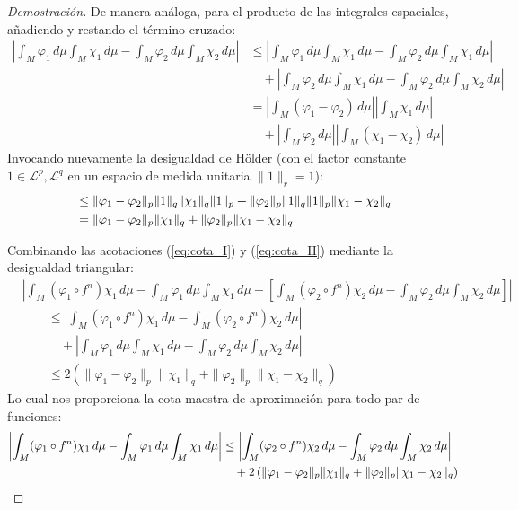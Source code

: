 \begin{proof}[Demostración]
	De manera análoga, para el producto de las integrales espaciales, añadiendo y restando el término cruzado:
	\begin{align*}
		\left| \int_M \varphi_1 \, d\mu \int_M \chi_1 \, d\mu - \int_M \varphi_2 \, d\mu \int_M \chi_2 \, d\mu \right| &\le \left| \int_M \varphi_1 \, d\mu \int_M \chi_1 \, d\mu - \int_M \varphi_2 \, d\mu \int_M \chi_1 \, d\mu \right| \\
		&\quad + \left| \int_M \varphi_2 \, d\mu \int_M \chi_1 \, d\mu - \int_M \varphi_2 \, d\mu \int_M \chi_2 \, d\mu \right| \\
		&= \left| \int_M (\varphi_1 - \varphi_2) \, d\mu \right| \left| \int_M \chi_1 \, d\mu \right| \\
		&\quad + \left| \int_M \varphi_2 \, d\mu \right| \left| \int_M (\chi_1 - \chi_2) \, d\mu \right|
	\end{align*}
	Invocando nuevamente la desigualdad de Hölder (con el factor constante $1 \in \mathcal{L}^p, \mathcal{L}^q$ en un espacio de medida unitaria $\|1\|_r = 1$):
	\begin{align}
		&\le \|\varphi_1 - \varphi_2\|_p \|1\|_q \|\chi_1\|_q \|1\|_p + \|\varphi_2\|_p \|1\|_q \|1\|_p \|\chi_1 - \chi_2\|_q \notag \\
		&= \|\varphi_1 - \varphi_2\|_p \|\chi_1\|_q + \|\varphi_2\|_p \|\chi_1 - \chi_2\|_q \label{eq:cota_II}
	\end{align}
	
	Combinando las acotaciones (\ref{eq:cota_I}) y (\ref{eq:cota_II}) mediante la desigualdad triangular:
	\begin{align*}
		&\left| \int_M (\varphi_1 \circ f^n)\chi_1 \, d\mu - \int_M \varphi_1 \, d\mu \int_M \chi_1 \, d\mu - \left[ \int_M (\varphi_2 \circ f^n)\chi_2 \, d\mu - \int_M \varphi_2 \, d\mu \int_M \chi_2 \, d\mu \right] \right| \\
		&\qquad \le \left| \int_M (\varphi_1 \circ f^n)\chi_1 \, d\mu - \int_M (\varphi_2 \circ f^n)\chi_2 \, d\mu \right| \\
		&\qquad \quad + \left| \int_M \varphi_1 \, d\mu \int_M \chi_1 \, d\mu - \int_M \varphi_2 \, d\mu \int_M \chi_2 \, d\mu \right| \\
		&\qquad \le 2\left( \|\varphi_1 - \varphi_2\|_p \|\chi_1\|_q + \|\varphi_2\|_p \|\chi_1 - \chi_2\|_q \right)
	\end{align*}
	Lo cual nos proporciona la cota maestra de aproximación para todo par de funciones:
	\begin{align}
		\left| \int_M (\varphi_1 \circ f^n)\chi_1 \, d\mu - \int_M \varphi_1 \, d\mu \int_M \chi_1 \, d\mu \right| &\le \left| \int_M (\varphi_2 \circ f^n)\chi_2 \, d\mu - \int_M \varphi_2 \, d\mu \int_M \chi_2 \, d\mu \right| \notag \\
		&\quad + 2\left( \|\varphi_1 - \varphi_2\|_p \|\chi_1\|_q + \|\varphi_2\|_p \|\chi_1 - \chi_2\|_q \right) \label{eq:cota_maestra}
	\end{align}
	

\end{proof}
